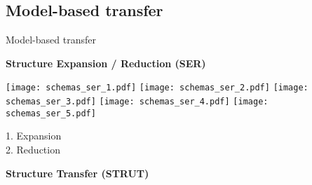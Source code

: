 \subsection{Model-based transfer}

\begin{frame}{Model-based transfer}

\centering\citet{segev2017learn}

\begin{minipage}[t]{0.49\linewidth}
    \vspace{0pt}
    \centering
    \textbf{Structure Expansion / Reduction (SER)}
    
    \renewcommand{\ratio}{0.55}
    \begin{overprint}
        \centering\texttt{[image: schemas\_ser\_1.pdf]}
        \centering\texttt{[image: schemas\_ser\_2.pdf]}
        \centering\texttt{[image: schemas\_ser\_3.pdf]}
        \centering\texttt{[image: schemas\_ser\_4.pdf]}
        \centering\texttt{[image: schemas\_ser\_5.pdf]}
    \end{overprint}
    
    \pause \pause
    \textcolor{myblue}{1. Expansion}\\
    \pause
    \textcolor{myorange}{2. Reduction}\\
    \bigskip

\end{minipage}\hfill
\begin{minipage}[t]{0.49\linewidth}
    \vspace{0pt}
    \centering
    \pause \pause
    \textbf{Structure Transfer (STRUT)}
    

\end{minipage}
\end{frame}
